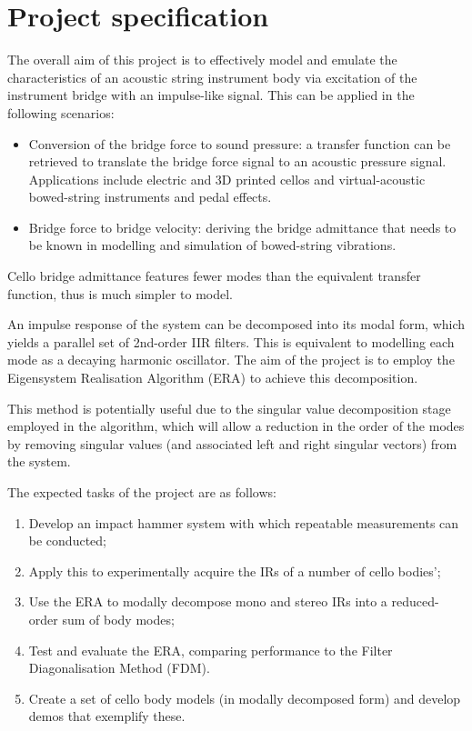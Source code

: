 \section{Project specification}
\label{sec:proj-spec}
The overall aim of this project is to effectively model and emulate the characteristics of an acoustic string instrument body via excitation of the instrument bridge with an impulse-like signal. This can be applied in the following scenarios:

\begin{itemize}
\item Conversion of the bridge force to sound pressure: a transfer function can be retrieved to translate the bridge force signal to an acoustic pressure signal. Applications include electric and 3D printed cellos and virtual-acoustic bowed-string instruments and pedal effects.
\item Bridge force to bridge velocity: deriving the bridge admittance that needs to be known in modelling and simulation of bowed-string vibrations.
\end{itemize}

 Cello bridge admittance features fewer modes than the equivalent transfer function, thus is much simpler to model.

 An impulse response of the system can be decomposed into its modal form, which yields a parallel set of 2nd-order IIR filters. This is equivalent to modelling each mode as a decaying harmonic oscillator. The aim of the project is to employ the Eigensystem Realisation Algorithm (ERA) to achieve this decomposition.

 This method is potentially useful due to the singular value decomposition stage employed in the algorithm, which will allow a reduction in the order of the modes by removing singular values (and associated left and right singular vectors) from the system.

 The expected tasks of the project are as follows:

 \begin{enumerate}
    \item Develop an impact hammer system with which repeatable measurements can be conducted;
    \item Apply this to experimentally acquire the IRs of a number of cello bodies';
    \item Use the ERA to modally decompose mono and stereo IRs into a reduced-order sum of body modes;
    \item Test and evaluate the ERA, comparing performance to the Filter Diagonalisation Method (FDM).
    \item Create a set of cello body models (in modally decomposed form) and develop demos that exemplify these.
 \end{enumerate}

